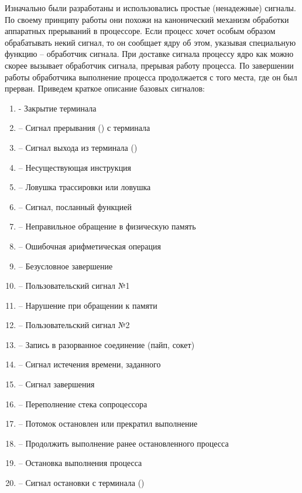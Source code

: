 Изначально были разработаны и использовались простые (ненадежные) сигналы. По своему принципу работы они похожи на канонический механизм обработки аппаратных прерываний в процессоре. Если процесс хочет особым образом обрабатывать некий сигнал, то он сообщает ядру об этом, указывая специальную функцию – обработчик сигнала. При доставке сигнала процессу ядро как можно скорее вызывает обработчик сигнала, прерывая работу процесса. По завершении работы обработчика выполнение процесса продолжается с того места, где он был прерван. Приведем краткое описание базовых сигналов:
\begin{enumerate}[itemsep=-0.2em]
	\item {} - Закрытие терминала
	\item {} -- Сигнал прерывания () с терминала
	\item {} -- Сигнал выхода из терминала (\ctrl{$\backslash$})
	\item {} -- Несуществующая инструкция
	\item {} -- Ловушка трассировки или ловушка
	\item {} -- Сигнал, посланный функцией 
	\item {} -- Неправильное обращение в физическую память
	\item {} -- Ошибочная арифметическая операция
	\item {} -- Безусловное завершение
	\item {} -- Пользовательский сигнал №1
	\item {} -- Нарушение при обращении к памяти
	\item {} -- Пользовательский сигнал №2
	\item {} -- Запись в разорванное соединение (пайп, сокет)
	\item {} -- Сигнал истечения времени, заданного 
	\item {} -- Сигнал завершения
	\item {} -- Переполнение стека сопроцессора
	\item {} -- Потомок остановлен или прекратил выполнение
	\item {} -- Продолжить выполнение ранее остановленного процесса
	\item {} -- Остановка выполнения процесса
	\item {} -- Сигнал остановки с терминала ()

\end{enumerate}

